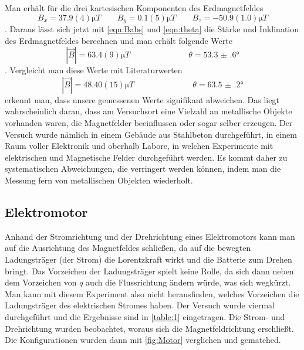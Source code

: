 Man erhält für die drei kartesischen Komponenten des Erdmagnetfeldes
\begin{equation}\label{eqn:Bxyz}
	B_x = 37.9(4) \unit{\micro T} \qquad B_y = 0.1(5) \unit{\micro T} \qquad B_z = -50.9(1.0) \unit{\micro T}
\end{equation}
. Daraus lässt sich jetzt mit \autoref{eqn:Babs} und \autoref{eqn:theta} die Stärke und Inklination des Erdmagnetfeldes berechnen und man erhält folgende Werte
\begin{equation}\label{eqn:results}
	|\vec{B}| = 63.4(9) \unit{\micro T} \hspace{3cm} \theta = \ang{53.3(6)}
\end{equation}
. Vergleicht man diese Werte mit Literaturwerten \cite{MagCal}
\begin{equation}\label{key}
	|\vec{B}| = 48.40(15) \unit{\micro T} \hspace{3cm} \theta = \ang{63.5(2)}
\end{equation}
erkennt man, dass unsere gemessenen Werte signifikant abweichen. Das liegt wahrscheinlich daran, dass am Versuchsort eine Vielzahl an metallische Objekte vorhanden waren, die Magnetfelder beeinflussen oder sogar selber erzeugen. Der Versuch wurde nämlich in einem Gebäude aus Stahlbeton durchgeführt, in einem Raum voller Elektronik und oberhalb Labore, in welchen Experimente mit elektrischen und Magnetische Felder durchgeführt werden. Es kommt daher zu systematischen Abweichungen, die verringert werden können, indem man die Messung fern von metallischen Objekten wiederholt.

\subsection{Elektromotor}
Anhand der Stromrichtung und der Drehrichtung eines Elektromotors kann man auf die Ausrichtung des Magnetfeldes schließen, da auf die bewegten Ladungsträger (der Strom) die Lorentzkraft wirkt und die Batterie zum Drehen bringt. Das Vorzeichen der Ladungsträger spielt keine Rolle, da sich dann neben dem Vorzeichen von \( q \) auch die Flussrichtung ändern würde, was sich wegkürzt. Man kann mit diesem Experiment also nicht herausfinden, welches Vorzeichen die Ladungsträger des elektrischen Stromes haben. Der Versuch wurde viermal durchgeführt und die Ergebnisse sind in \autoref{table:1} eingetragen. Die Strom- und Drehrichtung wurden beobachtet, woraus sich die Magnetfeldrichtung erschließt. Die Konfigurationen wurden dann mit \autoref{fig:Motor} verglichen und gematched. 

